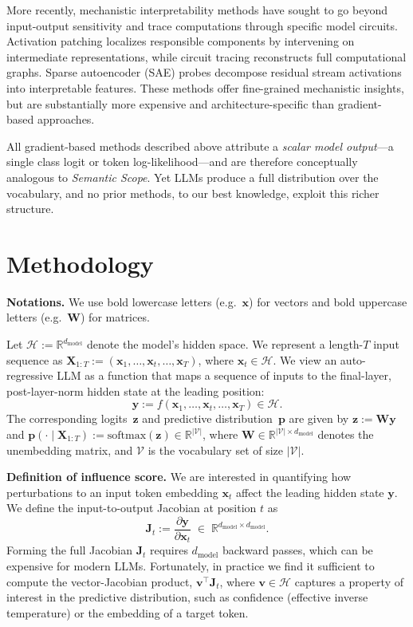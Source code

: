 \documentclass{article}
\begin{document}
More recently, mechanistic interpretability methods have sought to go beyond input-output sensitivity and trace computations through specific model circuits.
Activation patching \citep{heimersheim2024useinterpretactivationpatching, pmlr-v235-ghandeharioun24a} localizes responsible components by intervening on intermediate representations, while circuit tracing \citep{ameisen2025circuit} reconstructs full computational graphs.
Sparse autoencoder (SAE) probes \citep{lieberum2024gemmascopeopensparse} decompose residual stream activations into interpretable features.
These methods offer fine-grained mechanistic insights, but are substantially more expensive and architecture-specific than gradient-based approaches.

All gradient-based methods described above attribute a \emph{scalar model output}---a single class logit or token log-likelihood---and are therefore conceptually analogous to \emph{Semantic Scope}.
Yet LLMs produce a full distribution over the vocabulary, and no prior methods, to our best knowledge, exploit this richer structure.


\section{Methodology}
\label{sec:methodology}


\textbf{Notations.} We use bold lowercase letters (e.g.\ $\bm{x}$) for vectors and bold uppercase letters (e.g.\ $\bm{W}$) for matrices. 

Let $\mathcal H := \mathbb R^{d_{\text{model}}}$ denote the model’s hidden space. We represent a length-$T$ input sequence as
$\bm X_{1:T} := (\bm{x}_1,\ldots, \bm{x}_t, \ldots, \bm{x}_T)$, where $\bm{x}_t \in \mathcal H$.
We view an auto-regressive LLM as a function that maps a sequence of inputs
to the final-layer, post-layer-norm hidden state at the leading position:
\[
\bm y := f(\bm{x}_1,\ldots, \bm{x}_t, \ldots, \bm{x}_T) \in \mathcal H.
\]
The corresponding logits~$\bm{z}$ and predictive distribution~$\bm{p}$ are given by $\bm{z} := \bm{W}\bm{y}$ and $\bm{p}(\cdot \mid \bm{X}_{1:T}) := \mathrm{softmax}(\bm{z}) \in \mathbb{R}^{|\mathcal{V}|}$, where \(\bm{W} \in \mathbb{R}^{|\mathcal{V}| \times d_{\mathrm{model}}}\) denotes the unembedding matrix, 
and \(\mathcal{V}\) is the vocabulary set of size $|\mathcal{V}|$.

\noindent
\textbf{Definition of influence score.} 
We are interested in quantifying how perturbations to an input token embedding \(\bm{x}_t\) affect the leading hidden state \(\bm{y}\).
We define the input-to-output Jacobian at position \(t\) as
\[
\bm{J}_t := \frac{\partial \bm{y}}{\partial \bm{x}_t}\;\in\;\mathbb{R}^{d_{\mathrm{model}}\times d_{\mathrm{model}}}.
\]
Forming the full Jacobian \(\bm{J}_t\) requires \(d_{\mathrm{model}}\) backward passes, which can be expensive for modern LLMs.
Fortunately, in practice we find it sufficient to compute the vector-Jacobian product, $\bm{v}^\intercal \bm{J}_t$, where \(\bm{v} \in \mathcal{H}\) captures a property of interest in the predictive distribution, such as confidence (effective inverse temperature) or the embedding of a target token.
\end{document}
